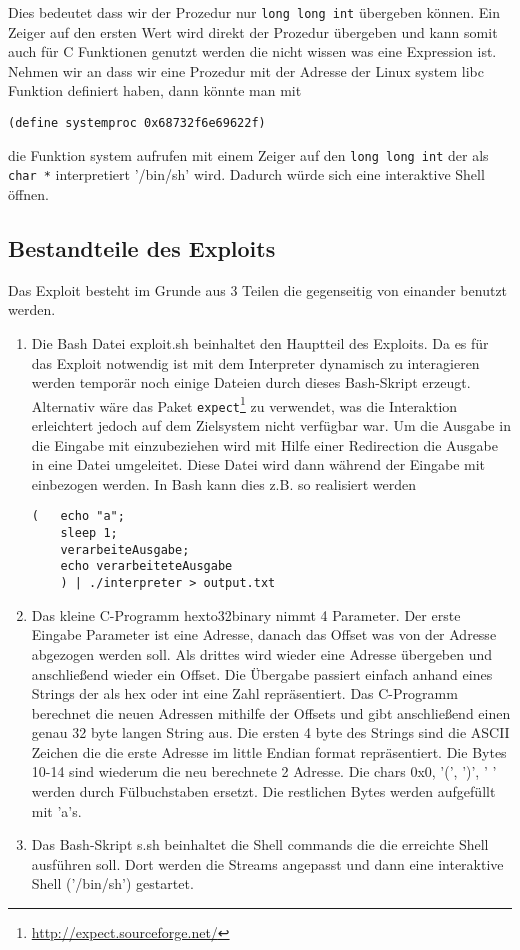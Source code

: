 Dies bedeutet dass wir der Prozedur nur \texttt{long long int} übergeben können. 
Ein Zeiger auf den ersten Wert wird direkt der Prozedur übergeben und kann somit auch für C Funktionen genutzt werden die nicht  wissen was eine Expression ist. 
Nehmen wir an dass wir eine Prozedur mit der Adresse der Linux system libc Funktion definiert haben, dann könnte man mit 
\begin{lstlisting}
(define systemproc 0x68732f6e69622f)
\end{lstlisting}
 die Funktion system aufrufen mit einem Zeiger auf den \texttt{long long int} der als \texttt{char *} interpretiert '/bin/sh' wird. Dadurch würde sich eine interaktive Shell öffnen.
\subsection{Bestandteile des Exploits}
Das Exploit besteht im Grunde aus 3 Teilen die gegenseitig von einander benutzt werden.
\begin{enumerate}
\item Die Bash Datei exploit.sh beinhaltet den Hauptteil des Exploits. Da es für das Exploit notwendig ist mit dem Interpreter dynamisch zu interagieren werden temporär noch einige Dateien durch dieses Bash-Skript erzeugt. 
Alternativ wäre das Paket \texttt{expect}\footnote{\url{http://expect.sourceforge.net/}} zu verwendet, was die Interaktion erleichtert jedoch auf dem Zielsystem nicht verfügbar war. 
Um die Ausgabe in die Eingabe mit einzubeziehen wird mit Hilfe einer Redirection die Ausgabe in eine Datei umgeleitet. Diese Datei wird dann während der Eingabe mit einbezogen werden. 
In Bash kann dies z.B. so realisiert werden 
\begin{lstlisting}
(	echo "a"; 
	sleep 1; 
	verarbeiteAusgabe; 
	echo verarbeiteteAusgabe
	) | ./interpreter > output.txt
\end{lstlisting}
\item Das kleine C-Programm hexto32binary nimmt 4 Parameter. Der erste Eingabe Parameter ist eine Adresse, danach das Offset was von der Adresse abgezogen werden soll. Als drittes wird wieder eine Adresse übergeben und anschließend wieder ein Offset.
Die Übergabe passiert einfach anhand eines Strings der als hex oder int eine Zahl repräsentiert. Das C-Programm berechnet die neuen Adressen mithilfe der Offsets und gibt anschließend einen genau 32 byte langen String aus.
 Die ersten 4 byte des Strings sind die ASCII Zeichen die die erste Adresse im little Endian format repräsentiert. 
Die Bytes 10-14 sind wiederum die neu berechnete 2 Adresse. Die chars 0x0, '(', ')', ' ' werden durch Fülbuchstaben ersetzt. Die restlichen Bytes werden aufgefüllt mit 'a's.
\item Das Bash-Skript s.sh beinhaltet die Shell commands die die erreichte Shell ausführen soll. Dort werden die Streams angepasst und dann eine interaktive Shell ('/bin/sh') gestartet.
\end{enumerate}
